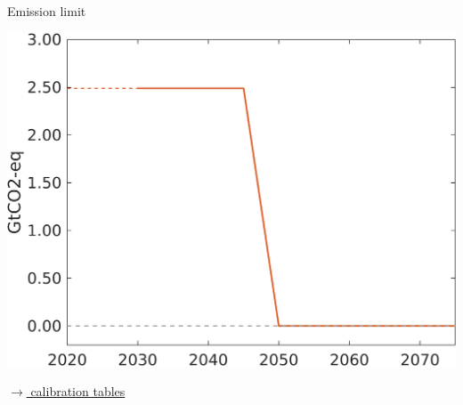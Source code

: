 \documentclass[11pt,aspectratio=169]{beamer}
\begin{document}
\begin{frame}{Emission limit}
	\vspace{6mm}
\centering
	\begin{minipage}[]{0.5\textwidth}
\includegraphics[width=1\textwidth]{../codding_model/own_basedOnFried/optimalPol_elastS_DisuSci/figures/all_1705/emission_lim.png}
\end{minipage}


\vspace{9mm}
\hfill
\hyperlink{calib}{\tiny{$\rightarrow$ calibration tables}} 

\end{frame}
\hypertarget{resback}{}
\end{document}
